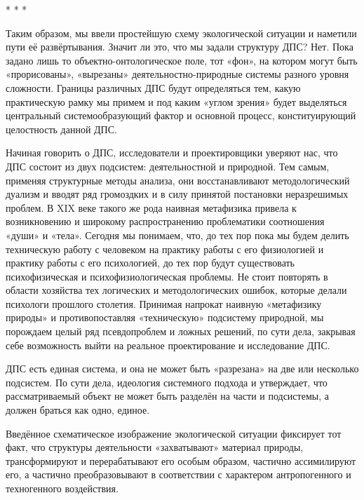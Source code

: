 \documentclass[11pt,a4paper]{article}
\begin{document}
\begin{center}
  * * *
\end{center}

Таким образом, мы ввели простейшую схему экологической ситуации и наметили
пути её развёртывания. Значит ли это, что мы задали структуру ДПС? Нет. Пока
задано лишь то объектно-онтологическое поле, тот «фон», на котором могут быть
«прорисованы», «вырезаны» деятельностно-природные системы разного уровня
сложности. Границы различных ДПС будут определяться тем, какую практическую
рамку мы примем и под каким «углом зрения» будет выделяться центральный
системообразующий фактор и основной процесс, конституирующий целостность
данной ДПС.

Начиная говорить о ДПС, исследователи и проектировщики уверяют нас, что ДПС
состоит из двух подсистем: деятельностной и природной. Тем самым, применяя
структурные методы анализа, они восстанавливают методологический дуализм и
вводят ряд громоздких и в силу принятой постановки неразрешимых проблем. В XIX
веке такого же рода наивная метафизика привела к возникновению и широкому
распространению проблематики соотношения «души» и «тела». Сегодня мы понимаем,
что, до тех пор пока мы будем делить техническую работу с человеком на
практику работы с его физиологией и практику работы с его психологией, до тех
пор будут существовать психофизическая и психофизиологическая проблемы. Не
стоит повторять в области хозяйства тех логических и методологических ошибок,
которые делали психологи прошлого столетия. Принимая напрокат наивную
«метафизику природы» и противопоставляя «техническую» подсистему природной, мы
порождаем целый ряд псевдопроблем и ложных решений, по сути дела, закрывая
себе возможность выйти на реальное проектирование и исследование ДПС. 

ДПС есть единая система, и она не может быть «разрезана» на две или несколько
подсистем. По сути дела, идеология системного подхода и утверждает, что
рассматриваемый объект не может быть разделён на части и подсистемы, а должен
браться как одно, единое. 

Введённое схематическое изображение экологической ситуации фиксирует тот факт,
что структуры деятельности «захватывают» материал природы, трансформируют и
перерабатывают его особым образом, частично ассимилируют его, а частично
преобразовывают в соответствии с характером антропогенного и техногенного
воздействия. 
\end{document}
